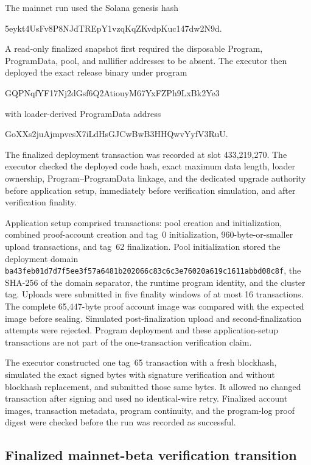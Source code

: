 The mainnet run used the Solana genesis hash
\begin{center}
  \small\ttfamily
  5eykt4UsFv8P8NJdTREpY1vzqKqZKvdpKuc147dw2N9d.
\end{center}
A read-only finalized snapshot first required the disposable Program,
ProgramData, pool, and nullifier addresses to be absent.  The executor then
deployed the exact release binary under program
\begin{center}
  \small\ttfamily
  GQPNqfYF17Nj2dGsf6Q2AtiouyM67YxFZPh9LxBk2Ye3
\end{center}
with loader-derived ProgramData address
\begin{center}
  \small\ttfamily
  GoXXs2juAjmpvcsX7iLdHsGJCwBwB3HHQwvYyfV3RuU.
\end{center}
The finalized deployment transaction was recorded at slot 433,219,270.  The
executor checked the deployed code hash, exact maximum data length, loader
ownership, Program--ProgramData linkage, and the dedicated upgrade authority
before application setup, immediately before verification simulation, and
after verification finality.

Application setup comprised \ProfileMainnetSetupTransactions{} transactions:
pool creation and initialization, combined proof-account creation and tag~0
initialization, \ProfileUploadTransactions{} 960-byte-or-smaller upload
transactions, and tag~62 finalization.  Pool initialization stored the
deployment domain
\nolinkurl{ba43feb01d7d7f5ee3f57a6481b202066c83c6c3e76020a619c1611abbd08c8f},
the SHA-256 of the domain separator, the runtime program identity, and the
cluster tag.  Uploads were submitted in five finality windows of at most 16
transactions.  The complete 65,447-byte proof account image was compared with
the expected image before sealing.  Simulated
post-finalization upload and second-finalization attempts were rejected.
Program deployment and these application-setup transactions are not part of
the one-transaction verification claim.

The executor constructed one tag~65 transaction with a fresh blockhash,
simulated the exact signed bytes with signature verification and without
blockhash replacement, and submitted those same bytes.  It allowed no changed
transaction after signing and used no identical-wire retry.  Finalized
account images, transaction metadata, program continuity, and the program-log
proof digest were checked before the run was recorded as successful.

\subsection{Finalized mainnet-beta verification transition}
\label{sec:evaluation-mainnet-result}

